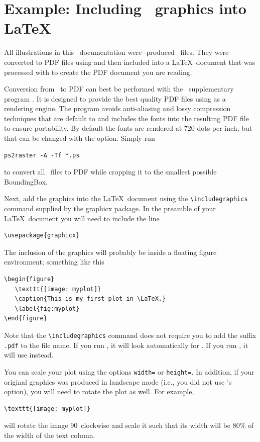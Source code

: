 \section{Example: Including \gmt\ graphics into \LaTeX}

All illustrations in this \GMT\ documentation were \GMT-produced \PS\ files. They were converted to PDF files using  and then included into a \LaTeX\ document that was processed with  to create the PDF document you are reading.

Conversion from \PS\ to PDF can best be performed with the \GMT\ supplementary program . It is designed to provide the best quality PDF files using  as a rendering engine. The program  avoids anti-aliasing and lossy compression techniques that are default to  and includes the fonts into the resulting PDF file to ensure portability. By default the fonts are rendered at 720 dots-per-inch, but that can be changed with the  option. Simply run
\small
\begin{verbatim}
ps2raster -A -Tf *.ps
\end{verbatim}
\normalsize
to convert all \PS\ files to PDF while cropping it to the smallest possible BoundingBox.

Next, add the graphics into the \LaTeX\ document using the \verb|\includegraphics| command supplied by the \textsf{graphicx} package. In the preamble of your \LaTeX\ document you will need to include the line
\small
\begin{verbatim}
\usepackage{graphicx}
\end{verbatim}
\normalsize
The inclusion of the graphics will probably be inside a floating figure environment; something like this
\small
\begin{verbatim}
\begin{figure}
   \texttt{[image: myplot]}
   \caption{This is my first plot in \LaTeX.}
   \label{fig:myplot}
\end{figure}
\end{verbatim}
\normalsize
Note that the \verb|\includegraphics| command does not require you to add the suffix \verb|.pdf| to the file name. If you run , it will look automatically for . If you run , it will use  instead.

You can scale your plot using the options \verb|width=| or \verb|height=|. In addition, if your original graphics was produced in landscape mode (i.e., you did not use \GMT's  option), you will need to rotate the plot as well. For example,
\small
\begin{verbatim}
\texttt{[image: myplot]}
\end{verbatim}
\normalsize
will rotate the image 90\DS\ clockwise and scale it such that its width will be 80\% of the width of the text column.

